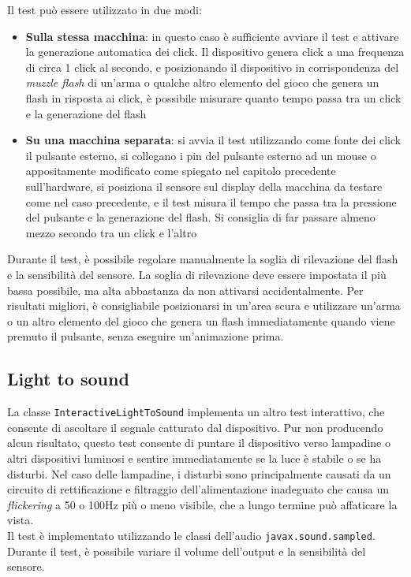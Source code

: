 Il test può essere utilizzato in due modi:\begin{itemize}
	\item \textbf{Sulla stessa macchina}: in questo caso è sufficiente avviare il test e attivare la generazione automatica dei click. Il dispositivo genera click a una frequenza di circa 1 click al secondo, e posizionando il dispositivo in corrispondenza del \textit{muzzle flash} di un'arma o qualche altro elemento del gioco che genera un flash in risposta ai click, è possibile misurare quanto tempo passa tra un click e la generazione del flash
	\item \textbf{Su una macchina separata}: si avvia il test utilizzando come fonte dei click il pulsante esterno, si collegano i pin del pulsante esterno ad un mouse o appositamente modificato come spiegato nel capitolo precedente sull'hardware, si posiziona il sensore sul display della macchina da testare come nel caso precedente, e il test misura il tempo che passa tra la pressione del pulsante e la generazione del flash. Si consiglia di far passare almeno mezzo secondo tra un click e l'altro
\end{itemize}

Durante il test, è possibile regolare manualmente la soglia di rilevazione del flash e la sensibilità del sensore. La soglia di rilevazione deve essere impostata il più bassa possibile, ma alta abbastanza da non attivarsi accidentalmente. Per risultati migliori, è consigliabile posizionarsi in un'area scura e utilizzare un'arma o un altro elemento del gioco che genera un flash immediatamente quando viene premuto il pulsante, senza eseguire un'animazione prima.

\subsection{Light to sound}
La classe \texttt{InteractiveLightToSound} implementa un altro test interattivo, che consente di ascoltare il segnale catturato dal dispositivo. Pur non producendo alcun risultato, questo test consente di puntare il dispositivo verso lampadine o altri dispositivi luminosi e sentire immediatamente se la luce è stabile o se ha disturbi. Nel caso delle lampadine, i disturbi sono principalmente causati da un circuito di rettificazione e filtraggio dell'alimentazione inadeguato che causa un \textit{flickering} a 50 o 100Hz più o meno visibile, che a lungo termine può affaticare la vista.\\
Il test è implementato utilizzando le classi dell'audio \texttt{javax.sound.sampled}. Durante il test, è possibile variare il volume dell'output e la sensibilità del sensore.

